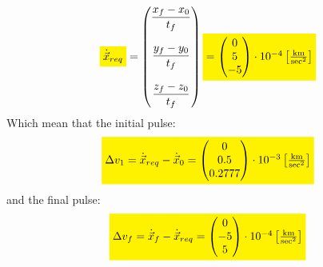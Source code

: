 \documentclass[11pt, a4paper]{article}
\begin{document}
\begin{equation}
    \colorbox{yellow}{$\dot{\vec{x}}_{req}$} = \begin{pmatrix}
        \displaystyle\frac{x_f-x_0}{t_f}\\\\
        \displaystyle\frac{y_f-y_0}{t_f}\\\\
        \displaystyle\frac{z_f-z_0}{t_f}
    \end{pmatrix}\colorbox{yellow}{$ = \begin{pmatrix}
       0\\5\\-5
    \end{pmatrix}\cdot10^{-4}\left[\frac{\mathrm{km}}{\mathrm{sec}^2}\right]$}
\end{equation}
Which mean that the initial pulse:
\begin{equation}
    \colorbox{yellow}{$\Delta v_1 = \dot{\vec{x}}_{req} - \dot{\vec{x}}_{0} = \begin{pmatrix}
        0\\0.5\\0.2777
    \end{pmatrix}\cdot10^{-3}\left[\frac{\mathrm{km}}{\mathrm{sec}^2}\right]$}
\end{equation}
and the final pulse:
\begin{equation}
    \colorbox{yellow}{$\Delta v_f = \dot{\vec{x}}_{f} - \dot{\vec{x}}_{req} = \begin{pmatrix}
        0\\-5\\5
    \end{pmatrix}\cdot10^{-4}\left[\frac{\mathrm{km}}{\mathrm{sec}^2}\right]$}
\end{equation}
\end{document}
